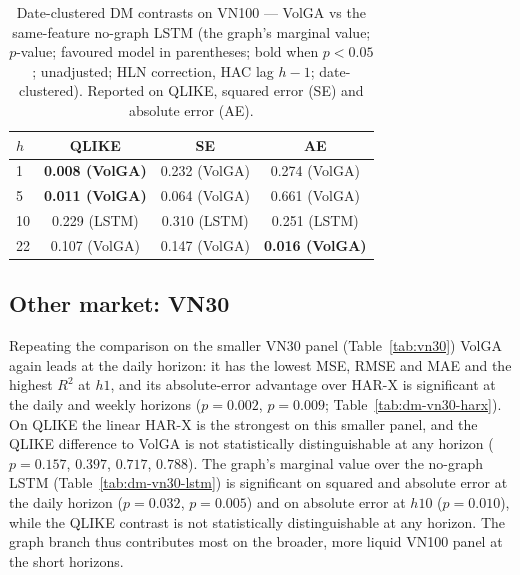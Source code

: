 \documentclass[runningheads]{llncs}
\begin{document}
\begin{table}[t]
\centering
\caption{Date-clustered DM contrasts on VN100 --- VolGA vs the same-feature no-graph LSTM (the graph's
marginal value; $p$-value; favoured model in parentheses; bold when $p<0.05$; unadjusted; HLN
correction, HAC lag $h{-}1$; date-clustered). Reported on QLIKE, squared error (SE) and absolute
error (AE).}
\label{tab:dm-vn100-lstm}
\footnotesize
\setlength{\tabcolsep}{8pt}
\begin{tabular}{lccc}
\toprule
$h$ & QLIKE & SE & AE \\
\midrule
1  & \textbf{0.008 (VolGA)} & 0.232 (VolGA) & 0.274 (VolGA) \\
5  & \textbf{0.011 (VolGA)} & 0.064 (VolGA) & 0.661 (VolGA) \\
10 & 0.229 (LSTM)           & 0.310 (LSTM)  & 0.251 (LSTM) \\
22 & 0.107 (VolGA)          & 0.147 (VolGA) & \textbf{0.016 (VolGA)} \\
\bottomrule
\end{tabular}
\end{table}

\subsection{Other market: VN30}\label{sec:vn30}
Repeating the comparison on the smaller VN30 panel (Table~\ref{tab:vn30}) VolGA again leads at the
daily horizon: it has the lowest MSE, RMSE and MAE and the highest $R^2$ at $h1$, and its
absolute-error advantage over HAR-X is significant at the daily and weekly horizons ($p=0.002$,
$p=0.009$; Table~\ref{tab:dm-vn30-harx}). On QLIKE the linear HAR-X is the strongest on this smaller
panel, and the QLIKE difference to VolGA is not statistically distinguishable at any horizon
($p=0.157$, $0.397$, $0.717$, $0.788$). The graph's marginal value over the no-graph LSTM
(Table~\ref{tab:dm-vn30-lstm}) is significant on squared and absolute error at the daily horizon
($p=0.032$, $p=0.005$) and on absolute error at $h10$ ($p=0.010$), while the QLIKE contrast is not
statistically distinguishable at any horizon. The graph branch thus contributes most on the broader,
more liquid VN100 panel at the short horizons.
\end{document}
